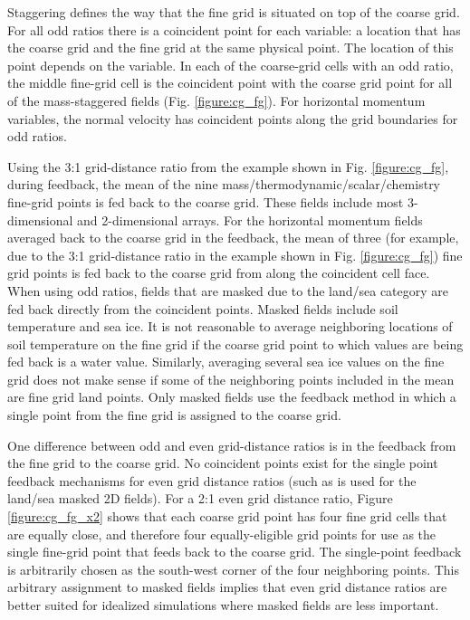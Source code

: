 Staggering defines the way that the fine grid is situated 
on top of the coarse grid.  For all odd ratios there is a coincident 
point for each variable: a location that has the coarse grid 
and the fine grid at the same physical point.  The location of 
this point depends on the variable. 
In each of the 
coarse-grid cells with an odd ratio, the middle fine-grid cell
is the coincident point with the coarse grid point for all of the 
mass-staggered fields (Fig. \ref{figure:cg_fg}).  
For horizontal momentum variables,
the normal velocity has coincident points along the grid boundaries for odd ratios.

Using the 3:1 grid-distance ratio
from the example shown in Fig. \ref{figure:cg_fg},
during feedback, the mean of the nine mass/thermodynamic/scalar/chemistry fine-grid 
points is fed back to the coarse grid.
These fields include most 3-dimensional and 2-dimensional arrays.  
For the horizontal momentum fields averaged back to the coarse grid in the 
feedback, the mean of three (for example, due to the 3:1 grid-distance ratio
in the example shown in Fig. \ref{figure:cg_fg}) fine grid
points is fed back to the coarse grid from along the coincident cell face.
When using odd ratios, fields that are masked due 
to the land/sea category are fed back directly from the coincident points.  
Masked fields include soil temperature and sea ice.  It is not reasonable 
to average neighboring locations of soil temperature on the fine grid 
if the coarse grid point to which values are being fed back is a water value.  Similarly, averaging
several sea ice values on the fine grid does not make sense if some of the neighboring
points included in the mean are fine grid land points. 
Only masked fields use the feedback method in which a single
point from the fine grid is assigned to the coarse grid.

One difference between odd and even grid-distance ratios 
is in the feedback from the fine grid to the coarse grid.  No 
coincident points exist for the single point feedback mechanisms
for even grid distance ratios
(such as is used for the land/sea masked 2D fields).  
For a 2:1 even grid distance ratio, Figure
\ref{figure:cg_fg_x2} shows that each coarse 
grid point has four fine grid cells that are equally close,
and therefore four equally-eligible grid points for use as the 
single fine-grid point that feeds back to the coarse grid.  The 
single-point feedback is arbitrarily chosen as the south-west 
corner of the four neighboring points.
This arbitrary assignment to masked fields implies that even
grid distance ratios are better suited for idealized simulations
where masked fields are less important.




